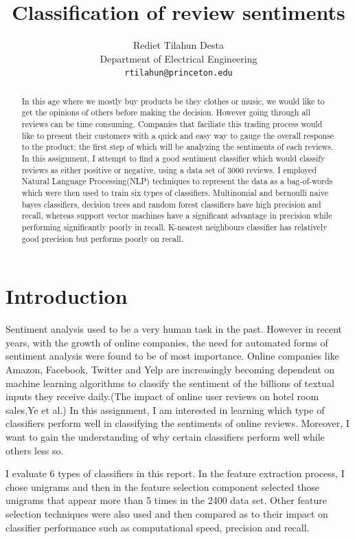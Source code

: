 \documentclass{article} %
\title{Classification of review sentiments}
\author{
Rediet Tilahun Desta\\
Department of Electrical Engineering\\
\texttt{rtilahun@princeton.edu} \\
}
\begin{document}
\maketitle

\begin{abstract}
In this age where we mostly buy products be they clothes or music, we would like to get the opinions of others before making the decision. However going through all reviews can be time consuming. Companies that faciliate this trading process would like to present their customers with a quick and easy way to gauge the overall response to the product; the first step of which will be analyzing the sentiments of each reviews. In this assignment, I attempt to find a good sentiment classifier which would classify reviews as either positive or negative, using a data set of 3000 reviews. I employed Natural Language Processing(NLP) techniques to represent the data as a bag-of-words which were then used to train six types of classifiers.  Multinomial and bernoulli naive bayes classifiers, decision trees and random forest classifiers have high precision and recall, whereas support vector machines have a significant advantage in precision while performing significantly poorly in recall. K-nearest neighbours classifier has relatively good precision but performs poorly on recall.
\end{abstract}

\section{Introduction}
Sentiment analysis used to be a very human task in the past. However in recent years, with the growth of online companies, the need for automated forms of sentiment analysis were found to be of most importance. Online companies like Amazon, Facebook, Twitter and Yelp are increasingly becoming dependent on machine learning algorithms to classify the sentiment of the billions of textual inputs they receive daily.(The impact of online user reviews on hotel room sales,Ye et al.) In this assignment, I am interested in learning which type of classifiers perform well in classifying the sentiments of online reviews. Moreover, I want to gain the understanding of why certain classifiers perform well while others less so. 

I evaluate 6 types of classifiers in this report. In the feature extraction process, I chose unigrams and then in the feature selection component selected those unigrams that appear more than 5 times in the 2400 data set. Other feature selection techniques were also used and then compared as to their impact on classifier performance such as computational speed, precision and recall. 
\end{document}
